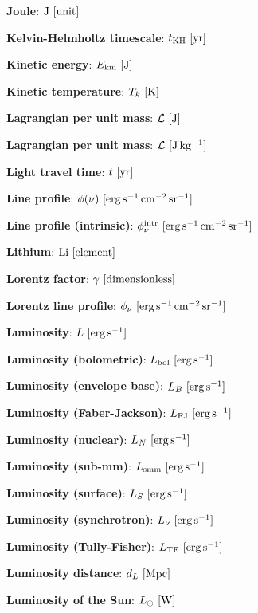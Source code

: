\documentclass[a4paper,10pt]{article}
\begin{document}
{\noindent}\textbf{Joule}: ${\rm J} ~ [{\rm unit}]$

{\noindent}\textbf{Kelvin-Helmholtz timescale}: $t_{\rm KH} ~ [{\rm yr}]$

{\noindent}\textbf{Kinetic energy}: $E_\mathrm{kin} ~ [{\rm J}]$

{\noindent}\textbf{Kinetic temperature}: $T_k ~ [{\rm K}]$

{\noindent}\textbf{Lagrangian per unit mass}: $\mathcal{L} ~ [{\rm J}]$

{\noindent}\textbf{Lagrangian per unit mass}: $\mathcal{L} ~ [{\rm J\,kg^{-1}}]$

{\noindent}\textbf{Light travel time}: $t ~ [{\rm yr}]$

{\noindent}\textbf{Line profile}: $\phi(\nu) ~ [{\rm erg\,s^{-1}\,cm^{-2}\,sr^{-1}}]$

{\noindent}\textbf{Line profile (intrinsic)}: $\phi_\nu^{\rm intr} ~ [{\rm erg\,s^{-1}\,cm^{-2}\,sr^{-1}}]$

{\noindent}\textbf{Lithium}: ${\rm Li} ~ [{\rm element}]$

{\noindent}\textbf{Lorentz factor}: $\gamma ~ [{\rm dimensionless}]$

{\noindent}\textbf{Lorentz line profile}: $\phi_\nu ~ [{\rm erg\,s^{-1}\,cm^{-2}\,sr^{-1}}]$

{\noindent}\textbf{Luminosity}: $L ~ [{\rm erg\,s^{-1}}]$

{\noindent}\textbf{Luminosity (bolometric)}: $L_{\rm bol} ~ [{\rm erg\,s^{-1}}]$

{\noindent}\textbf{Luminosity (envelope base)}: $L_B ~ [{\rm erg\,s^{-1}}]$

{\noindent}\textbf{Luminosity (Faber-Jackson)}: $L_\mathrm{FJ} ~ [{\rm erg\,s^{-1}}]$

{\noindent}\textbf{Luminosity (nuclear)}: $L_N ~ [{\rm erg\,s^{-1}}]$

{\noindent}\textbf{Luminosity (sub-mm)}: $L_{\rm smm} ~ [{\rm erg\,s^{-1}}]$

{\noindent}\textbf{Luminosity (surface)}: $L_S ~ [{\rm erg\,s^{-1}}]$

{\noindent}\textbf{Luminosity (synchrotron)}: $L_\nu ~ [{\rm erg\,s^{-1}}]$

{\noindent}\textbf{Luminosity (Tully-Fisher)}: $L_\mathrm{TF} ~ [{\rm erg\,s^{-1}}]$

{\noindent}\textbf{Luminosity distance}: $d_L ~ [{\rm Mpc}]$

{\noindent}\textbf{Luminosity of the Sun}: $L_\odot ~ [{\rm W}]$
\end{document}
